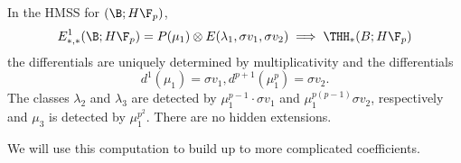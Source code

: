 \begin{lem}
	In the HMSS for $(\B;H\F_p)$, 
	\[
	E^1_{*,*}(\B;H\F_p)=P(\mu_1)\otimes E(\lambda_1, \sigma v_1, \sigma v_2)\implies \THH_*(B;H\F_p)
	\]
	the differentials are uniquely determined by multiplicativity and the differentials
	\[
	d^1(\mu_1) = \sigma v_1,
	d^{p+1}(\mu_1^p) = \sigma v_2. 
	\]
	The classes $\lambda_2$ and $\lambda_3$ are detected by $\mu_1^{p-1}\cdot\sigma v_1$ and $\mu_1^{p(p-1)}\sigma v_2$, respectively and $\mu_3$ is detected by $\mu_1^{p^2}$. There are no hidden extensions.  
\end{lem}

We will use this computation to build up to more complicated coefficients. 
\begin{comment}
We also recall that 
\[ THH_*(\mathbb{Z}_{(p)};\mathbb{Z}/p^m) \cong   THH_*(\mathbb{Z}_{(p)})\otimes_{\mathbb{Z}_{(p)}} \mathbb{Z}/p^m \] 
and we use this to show the following. 
									
\begin{lem}
	In the HMSS for $(\B;\mathbb{Z}/p^m)$
	\[
	E^1_{*,*}(\B;H\mathbb{Z}/p^m)= THH_*(\mathbb{Z}_{(p)})\otimes_{\mathbb{Z}_{(p)}}\mathbb{Z}/p^m
	\otimes E_{\mathbb{Z}_{(p)}}(\sigma v_1, \sigma v_2)\implies \THH_*(B;H\mathbb{Z}/p^m)
	\]
	the differentials are uniquely determined by... 
	\end{lem}
\end{comment}
